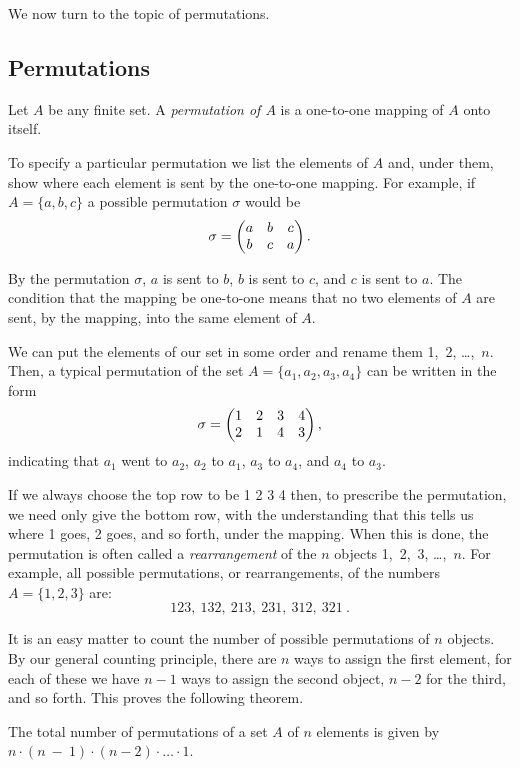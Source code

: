 We now turn to the topic of permutations.

\subsection*{Permutations}
\begin{definition}\label{def 3.1} Let $A$ be any finite set.  A {\em permutation of
$A$} is a one-to-one mapping of $A$ onto itself.
\end{definition}

To specify a particular permutation we list the elements of $A$ and, under them, show
where each element is sent by the one-to-one mapping.  For example, if $A = \{a,b,c\}$
a possible permutation $\sigma$ would be
$$
\sigma = \begin{pmatrix} a & b & c \cr b & c & a \cr\end{pmatrix}.
$$

By the permutation $\sigma$, $a$ is sent to $b$, $b$ is sent to $c$, and $c$ is sent
to $a$.  The condition that the mapping be one-to-one means that no two elements of
$A$ are sent, by the mapping, into the same element of $A$.

We can put the elements of our set in some order and rename them 1,~2, \dots,~$n$. 
Then, a typical permutation of the set $A =
\{a_1,a_2,a_3,a_4\}$ can be written in the form
$$
\sigma = \begin{pmatrix} 1 & 2 & 3 & 4 \cr 2 & 1 & 4 & 3 \cr\end{pmatrix},
$$ indicating that $a_1$ went to $a_2$, $a_2$ to $a_1$, $a_3$ to $a_4$, and $a_4$ to
$a_3$.

If we always choose the top row to be 1 2 3 4 then, to prescribe the permutation, we
need only give the bottom row, with the understanding that this tells us where 1 goes,
2 goes, and so forth, under the mapping.  When this is done, the permutation is often
called a {\em rearrangement} of the $n$ objects 1,~2,~3, \dots,~$n$.  For example,
all possible permutations, or rearrangements, of the numbers $A = \{1,2,3\}$ are:
$$ 
123,\ 132,\ 213,\ 231,\ 312,\ 321\ .
$$
\par
It is an easy matter to count the number of possible permutations of $n$ objects.  By
our general counting principle, there are $n$ ways to assign the first element, for
each of these we have $n - 1$ ways to assign the second object, $n - 2$ for the third,
and so forth.  This proves the following theorem.

\begin{theorem}\label{thm 3.1}\label{thm 3.1.1} The total number of permutations of a
set $A$ of $n$ elements is given by $n
\cdot (n~-~1) \cdot (n - 2) \cdot \ldots \cdot 1$.
\end{theorem}

